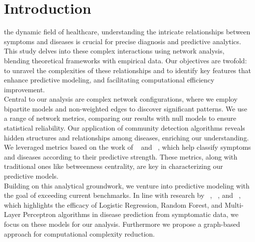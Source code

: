 \section{Introduction}

 the dynamic field of healthcare, understanding the intricate relationships between symptoms and diseases is crucial
for precise diagnosis and predictive analytics. This study delves into these complex interactions using network analysis,
blending theoretical frameworks with empirical data. Our objectives are twofold: to unravel the complexities of these
relationships and to identify key features that enhance predictive modeling, and facilitating computational efficiency improvement.\\
Central to our analysis are complex network configurations, where we employ bipartite models and non-weighted edges to discover significant patterns.
We use a range of network metrics, comparing our results with null models to ensure statistical reliability. Our application of community detection
algorithms reveals hidden structures and relationships among diseases, enriching our understanding.\\
We leveraged metrics based on the work of \citeauthor{Hidalgo_2009}~\cite{Hidalgo_2009} and \citeauthor{Hidalgo_2007}~\cite{Hidalgo_2007},
which help classify symptoms and diseases according to their predictive strength. These metrics, along with traditional ones like betweenness centrality,
are key in characterizing our predictive models.\\
Building on this analytical groundwork, we venture into predictive modeling with the goal of exceeding current benchmarks.
In line with research by \citeauthor{Kohli}~\cite{Kohli}, \citeauthor{Singh}~\cite{Singh}, and \citeauthor{Uddin2019Dec}~\cite{Uddin2019Dec},
which highlights the efficacy of Logistic Regression, Random Forest, and Multi-Layer Perceptron algorithms in disease prediction from symptomatic data,
we focus on these models for our analysis. Furthermore we propose a graph-based approach for computational complexity reduction.\\
